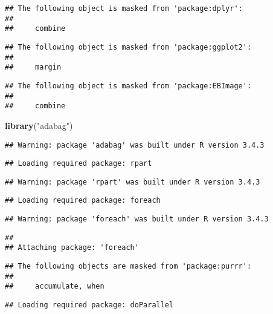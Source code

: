 \documentclass[]{article}
\newenvironment{Shaded}{\begin{snugshade}}{\end{snugshade}}
\newcommand{\KeywordTok}[1]{\textcolor[rgb]{0.13,0.29,0.53}{\textbf{#1}}}
\newcommand{\StringTok}[1]{\textcolor[rgb]{0.31,0.60,0.02}{#1}}
\newcommand{\NormalTok}[1]{#1}
\begin{document}
\begin{verbatim}
## The following object is masked from 'package:dplyr':
## 
##     combine
\end{verbatim}

\begin{verbatim}
## The following object is masked from 'package:ggplot2':
## 
##     margin
\end{verbatim}

\begin{verbatim}
## The following object is masked from 'package:EBImage':
## 
##     combine
\end{verbatim}

\begin{Shaded}
\begin{Highlighting}[]
\KeywordTok{library}\NormalTok{(}\StringTok{"adabag"}\NormalTok{)}
\end{Highlighting}
\end{Shaded}

\begin{verbatim}
## Warning: package 'adabag' was built under R version 3.4.3
\end{verbatim}

\begin{verbatim}
## Loading required package: rpart
\end{verbatim}

\begin{verbatim}
## Warning: package 'rpart' was built under R version 3.4.3
\end{verbatim}

\begin{verbatim}
## Loading required package: foreach
\end{verbatim}

\begin{verbatim}
## Warning: package 'foreach' was built under R version 3.4.3
\end{verbatim}

\begin{verbatim}
## 
## Attaching package: 'foreach'
\end{verbatim}

\begin{verbatim}
## The following objects are masked from 'package:purrr':
## 
##     accumulate, when
\end{verbatim}

\begin{verbatim}
## Loading required package: doParallel
\end{verbatim}
\end{document}
